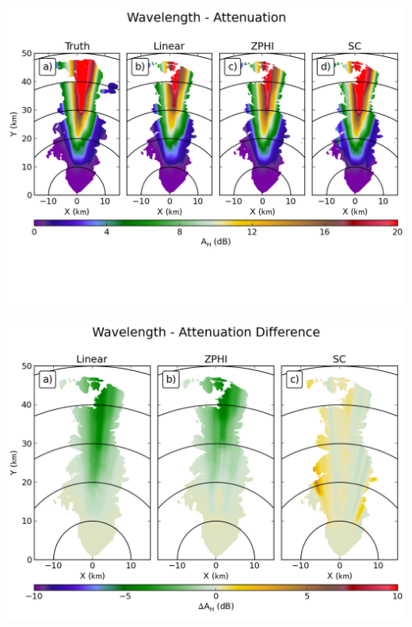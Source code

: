 \documentclass[red]{beamer}
\begin{document}
\begin{frame}
	\begin{center}
		\includegraphics[scale=0.55]{figures/C_Wavelength_Attenuation.png}
	\end{center}
\end{frame}

\begin{frame}
	\begin{center}
		\includegraphics[scale=0.45]{figures/C_Wavelength_Attenuation_Difference.png}
	\end{center}
\end{frame}
\end{document}
